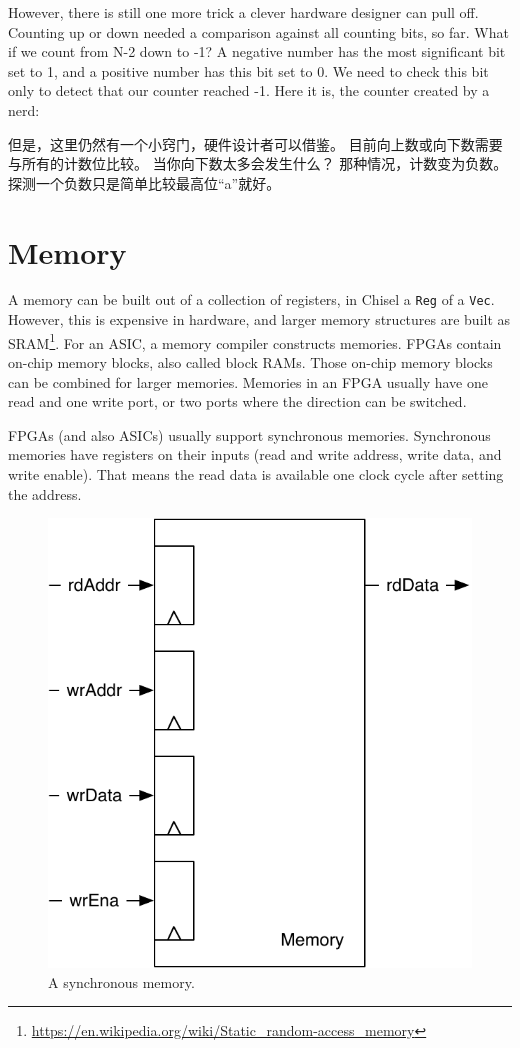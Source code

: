 \documentclass[%
    10pt,
    headinclude, footexclude,
    openright, %
    notitlepage,
    cleardoubleempty,
    headsepline,
    pointlessnumbers,
    bibtotoc, idxtotoc,
    ]{scrbook}
\newcommand{\code}[1]{{\small{\texttt{#1}}}}
\newcommand{\scale}{0.7}
\newcommand{\myref}[2]{\href{#1}{#2}}
\renewcommand{\myref}[2]{{#2}{\footnote{\url{#1}}}}
\begin{document}
However, there is still one more trick a clever hardware designer can pull off.
Counting up or down needed a comparison against all counting bits, so far.
What if we count from N-2 down to -1? A negative number has the most significant bit
set to 1, and a positive number has this bit set to 0. We need to check this bit only to detect
that our counter reached -1. Here it is, the counter created by a nerd:

但是，这里仍然有一个小窍门，硬件设计者可以借鉴。
目前向上数或向下数需要与所有的计数位比较。
当你向下数太多会发生什么？
那种情况，计数变为负数。探测一个负数只是简单比较最高位“a”就好。


\section{Memory}

A memory can be built out of a collection of registers, in Chisel a \code{Reg} of a \code{Vec}.
However, this is expensive in hardware, and larger memory structures are built
as \myref{https://en.wikipedia.org/wiki/Static_random-access_memory}{SRAM}.
For an ASIC, a memory compiler constructs memories.
FPGAs contain on-chip memory blocks, also called block RAMs.
Those on-chip memory blocks can be combined for larger memories.
Memories in an FPGA usually have one read and one write port, or
two ports where the direction can be switched.

FPGAs (and also ASICs) usually support synchronous memories.
Synchronous memories have registers on their inputs (read and write address, write data,
and write enable). That means the read data is available one clock
cycle after setting the address.

\begin{figure}
  \centering
  \includegraphics[scale=\scale]{figures/memory}
  \caption{A synchronous memory.}
  \label{fig:memory}
\end{figure}
\end{document}
